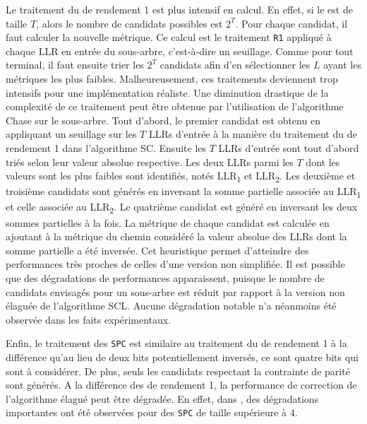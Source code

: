 Le traitement du \noeud de rendement 1 est plus intensif en calcul. En effet, si le \noeud est de taille $T$, alors le nombre de candidats possibles est $2^T$. Pour chaque candidat, il faut calculer la nouvelle métrique. Ce calcul est le traitement \texttt{R1} appliqué à chaque LLR en entrée du sous-arbre, c'est-à-dire un seuillage. Comme pour tout \noeud terminal, il faut ensuite trier les $2^T$ candidats afin d'en sélectionner les $L$ ayant les métriques les plus faibles. Malheureusement, ces traitements deviennent trop intensifs pour une implémentation réaliste. Une diminution drastique de la complexité de ce traitement peut être obtenue par l'utilisation de l'algorithme \og Chase \fg \cite{chase_class_1972} sur le sous-arbre. Tout d'abord, le premier candidat est obtenu en appliquant un seuillage sur les $T$ LLRs d'entrée à la manière du traitement du \noeud de rendement 1 dans l'algorithme SC. Ensuite les $T$ LLRs d'entrée sont tout d'abord triés selon leur valeur absolue respective. Les deux LLRs parmi les $T$  dont les valeurs sont les plus faibles sont identifiés, notés LLR\textsubscript{1} et LLR\textsubscript{2}. Les deuxième et troisième candidats sont générés en inversant la somme partielle associée au LLR\textsubscript{1} et celle associée au LLR\textsubscript{2}. Le quatrième candidat est généré en inversant les deux sommes partielles à la fois. La métrique de chaque candidat est calculée en ajoutant à la métrique du chemin considéré la valeur absolue des LLRs dont la somme partielle a été inversée. Cet heuristique permet d'atteindre des performances très proches de celles d'une version non simplifiée. Il est possible que des dégradations de performances apparaissent, puisque le nombre de candidats envisagés pour un sous-arbre est réduit par rapport à la version non élaguée de l'algorithme SCL. Aucune dégradation notable n'a néanmoins été observée dans les faits expérimentaux.

 

Enfin, le traitement des \noeuds \texttt{SPC} est similaire au traitement du \noeud de rendement 1 à la différence qu'au lieu de deux bits potentiellement inversés, ce sont quatre bits qui sont à considérer. De plus, seuls les candidats respectant la contrainte de parité sont générés. A la différence des \noeuds de rendement 1, la performance de correction de l'algorithme élagué peut être dégradée. En effet, dans \cite{sarkis_fast_2016}, des dégradations importantes ont été observées pour des \noeuds \texttt{SPC} de taille supérieure à 4. 



